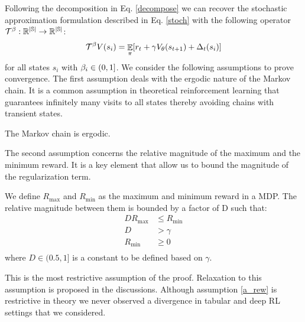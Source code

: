 Following the decomposition in Eq. \ref{decompose} we can recover the stochastic approximation formulation described in Eq. \ref{stoch} with the following operator $\mathcal{T}^{\beta}: \mathbb{R^{|\mathbb{S}|}} \rightarrow \mathbb{R^{|\mathbb{S}|}}$:
\begin{equation}
    \mathcal{T}^{\beta} V(s_i) = \mathop{\mathbb{E}}_{\pi}[r_t + \gamma V_{\theta}(s_{t+1}) + \Delta_t(s_i)]
\end{equation}
for all states $s_i$ with $\beta_i \in (0,1]$.
We consider the following assumptions to prove convergence.
The first assumption deals with the ergodic nature of the Markov chain. It is a common assumption in theoretical reinforcement learning that guarantees infinitely many visits to all states thereby avoiding chains with transient states.
\begin{assumption}
The Markov chain is ergodic.
\end{assumption}
The second assumption concerns the relative magnitude of the maximum and the minimum reward. It is a key element that allow us to bound the magnitude of the regularization term. 
\begin{assumption}
\label{a_rew}
We define $R_{\max}$ and $R_{\min}$ as the maximum and minimum reward in a MDP. The relative magnitude between them is bounded by a factor of D such that:
\begin{equation}
\begin{split}
    DR_{\text{max}}  &\leq R_{\text{min}}  \\
    D &> \gamma \\
    R_{\text{min}} &\geq 0\\
\end{split}
\end{equation}
where $D \in (0.5,1]$ is a constant to be defined based on $\gamma$.
\end{assumption}
This is the most restrictive assumption of the proof. Relaxation to this assumption is proposed in the discussions. Although assumption \ref{a_rew} is restrictive in theory we never observed a divergence in tabular and deep RL settings that we considered.

